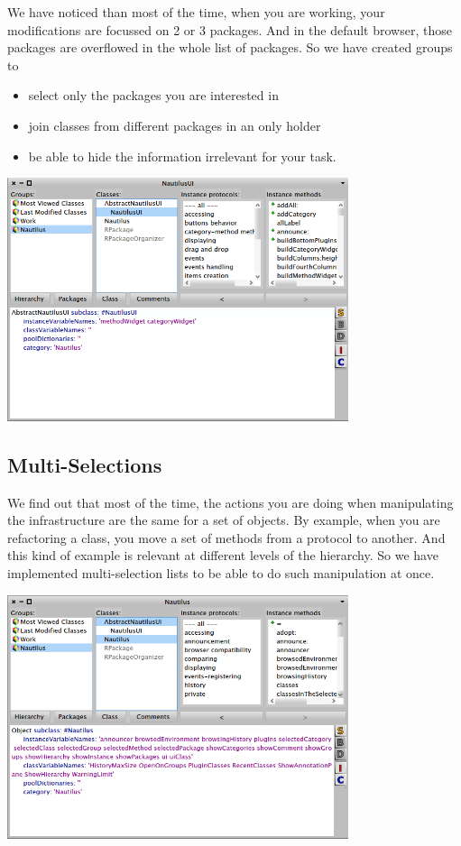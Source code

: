 \documentclass[a4paper,10pt,twoside]{book}
\begin{document}
We have noticed than most of the time, when you are working, your modifications are focussed on 2 or 3 packages. And in the default browser, those packages are overflowed in the whole list of packages. So we have created groups to 
\begin{itemize}
	\item select only the packages you are interested in
	\item join classes from different packages in an only holder
	\item be able to hide the information irrelevant for your task.
\end{itemize}
\begin{center}
	\includegraphics[width=10cm]{figures/group1}
	\label{fig:group1}
\end{center}

\subsection*{Multi-Selections}

We find out that most of the time, the actions you are doing when manipulating the infrastructure are the same for a set of objects. By example, when you are refactoring a class, you move a set of methods from a protocol to another. And this kind of example is relevant at different levels of the hierarchy. So we have implemented multi-selection lists to be able to do such manipulation at once.
\begin{center}
	\includegraphics[width=10cm]{figures/multiSelection1}
	\label{fig:multiSelection1}
\end{center}
\end{document}
